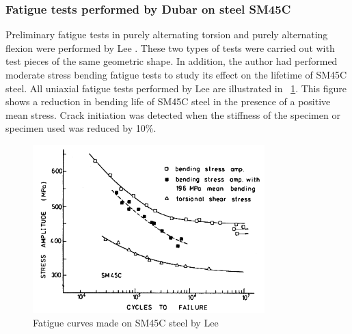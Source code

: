 \documentclass[3p,times,number,review]{elsarticle}
\newcommand{\figref}[1]{\figurename~\ref{#1}}
\begin{document}
\subsubsection{Fatigue tests performed by Dubar on steel SM45C}
Preliminary fatigue tests in purely alternating torsion and purely alternating flexion were performed by Lee \cite{lee2013out}. These two types of tests were carried out with test pieces of the same geometric shape. In addition, the author had performed moderate stress bending fatigue tests to study its effect on the lifetime of SM45C steel. All uniaxial fatigue tests performed by Lee \cite{lee2013out} are illustrated in \figref{fig.SM45CSN}. This figure shows a reduction in bending life of SM45C steel in the presence of a positive mean stress. Crack initiation was detected when the stiffness of the specimen or specimen used was reduced by 10\%.
\begin{figure}[!h]
\centering
\includegraphics[width=0.8\textwidth]{figures//SM45C_SN.png} 
\caption{Fatigue curves made on SM45C steel by Lee \cite{lee2013out}}
\label{fig.SM45CSN}
\end{figure}
\end{document}

